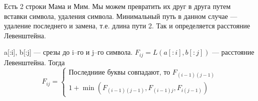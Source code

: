 \documentclass[a4paper,12pt]{article}
\theoremstyle{plain} %
\theoremstyle{definition} %
\theoremstyle{remark} %
\begin{document}
Есть 2 строки Мама и Мим. Мы можем превратить их друг в друга путем вставки символа, удаления символа. Минимальный путь в данном случае --- удаление последнего и замена, т.е. длина пути 2. Так и определяется расстояние Левенштейна.

a[:i], b[:j] --- срезы до i--го и j--го символа.
$F_{ij} = L(a[:i], b[:j])$ --- расстояние Левенштейна. Тогда\\
$$F_{ij}=
\begin{cases}
\text{Последниие буквы совпадают, то } F_{(i-1)(j-1)}\\
1+\min(F_{(i-1)(j-1)}, F_{(i-1)j}, F_{i(j-1)})
\end{cases}
$$






















\begin{comment}
\begin{center}
	\vfill \emph{{\small Г. С. Демьянов, \href{https://vk.com/id37346992}{VK}\\
С. С. Клявинек, \href{https://vk.com/id85132547}{VK}
}}
\end{center}
\end{comment}
\end{document}

